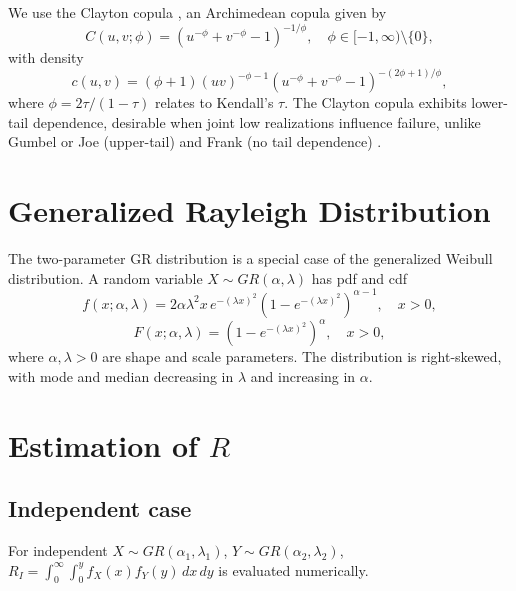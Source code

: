 \documentclass[twoside]{article}
\begin{document}
We use the Clayton copula \cite{Clayton1978}, an Archimedean copula \cite{Nelsen2006} given by
\[
C(u, v; \phi) = \left(u^{-\phi} + v^{-\phi} - 1\right)^{-1/\phi}, \quad \phi \in [-1, \infty) \setminus \{0\},
\]
with density
\begin{equation}
	c(u, v) = (\phi + 1)(uv)^{-\phi - 1} \left(u^{-\phi} + v^{-\phi} - 1\right)^{-(2\phi + 1)/\phi},
	\label{eq:clayton-density}
\end{equation}
where \(\phi = 2\tau/(1-\tau)\) relates to Kendall's \(\tau\).
The Clayton copula exhibits lower-tail dependence, desirable when joint low realizations influence failure, unlike Gumbel or Joe (upper-tail) and Frank (no tail dependence) \cite{Nelsen2006}.
\section{Generalized Rayleigh Distribution}

The two-parameter GR distribution \cite{SurlesPadgett2001} is a special case of the generalized Weibull distribution. A random variable \(X \sim GR(\alpha, \lambda)\) has pdf and cdf
\begin{equation}
	f(x; \alpha, \lambda) = 2 \alpha \lambda^{2} x \, e^{-(\lambda x)^2} \left(1 - e^{-(\lambda x)^2} \right)^{\alpha - 1}, \quad x > 0,
\end{equation}
\begin{equation}
	F(x; \alpha, \lambda) = \left(1 - e^{-(\lambda x)^2} \right)^{\alpha}, \quad x > 0,
	\label{cdfGR}
\end{equation}
where \(\alpha, \lambda > 0\) are shape and scale parameters. 
The distribution is right-skewed, with mode and median decreasing in $\lambda$ and increasing in $\alpha$.
\section{Estimation of \(R\)}

\subsection{Independent case}

For independent \(X \sim GR(\alpha_1, \lambda_1)\), \(Y \sim GR(\alpha_2, \lambda_2)\), \(R_I = \int_0^{\infty} \int_0^y f_X(x) f_Y(y) \, dx \, dy\) is evaluated numerically.
\end{document}
